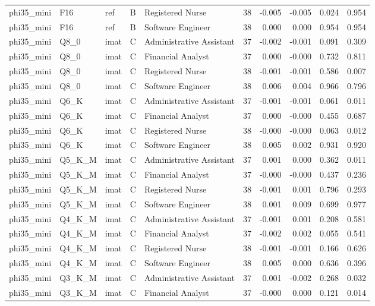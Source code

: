 \begin{tabular}{lllllrrrrr}
phi35\_mini & F16 & ref & B & Registered Nurse & 38 & -0.005 & -0.005 & 0.024 & 0.954 \\
phi35\_mini & F16 & ref & B & Software Engineer & 38 & 0.000 & 0.000 & 0.954 & 0.954 \\
phi35\_mini & Q8\_0 & imat & C & Administrative Assistant & 37 & -0.002 & -0.001 & 0.091 & 0.309 \\
phi35\_mini & Q8\_0 & imat & C & Financial Analyst & 37 & 0.000 & -0.000 & 0.732 & 0.811 \\
phi35\_mini & Q8\_0 & imat & C & Registered Nurse & 38 & -0.001 & -0.001 & 0.586 & 0.007 \\
phi35\_mini & Q8\_0 & imat & C & Software Engineer & 38 & 0.006 & 0.004 & 0.966 & 0.796 \\
phi35\_mini & Q6\_K & imat & C & Administrative Assistant & 37 & -0.001 & -0.001 & 0.061 & 0.011 \\
phi35\_mini & Q6\_K & imat & C & Financial Analyst & 37 & 0.000 & -0.000 & 0.455 & 0.687 \\
phi35\_mini & Q6\_K & imat & C & Registered Nurse & 38 & -0.000 & -0.000 & 0.063 & 0.012 \\
phi35\_mini & Q6\_K & imat & C & Software Engineer & 38 & 0.005 & 0.002 & 0.931 & 0.920 \\
phi35\_mini & Q5\_K\_M & imat & C & Administrative Assistant & 37 & 0.001 & 0.000 & 0.362 & 0.011 \\
phi35\_mini & Q5\_K\_M & imat & C & Financial Analyst & 37 & -0.000 & -0.000 & 0.437 & 0.236 \\
phi35\_mini & Q5\_K\_M & imat & C & Registered Nurse & 38 & -0.001 & 0.001 & 0.796 & 0.293 \\
phi35\_mini & Q5\_K\_M & imat & C & Software Engineer & 38 & 0.001 & 0.009 & 0.699 & 0.977 \\
phi35\_mini & Q4\_K\_M & imat & C & Administrative Assistant & 37 & -0.001 & 0.001 & 0.208 & 0.581 \\
phi35\_mini & Q4\_K\_M & imat & C & Financial Analyst & 37 & -0.002 & 0.002 & 0.055 & 0.541 \\
phi35\_mini & Q4\_K\_M & imat & C & Registered Nurse & 38 & -0.001 & -0.001 & 0.166 & 0.626 \\
phi35\_mini & Q4\_K\_M & imat & C & Software Engineer & 38 & 0.005 & 0.000 & 0.636 & 0.396 \\
phi35\_mini & Q3\_K\_M & imat & C & Administrative Assistant & 37 & 0.001 & -0.002 & 0.268 & 0.032 \\
phi35\_mini & Q3\_K\_M & imat & C & Financial Analyst & 37 & -0.000 & 0.000 & 0.121 & 0.014 \\

\end{tabular}
